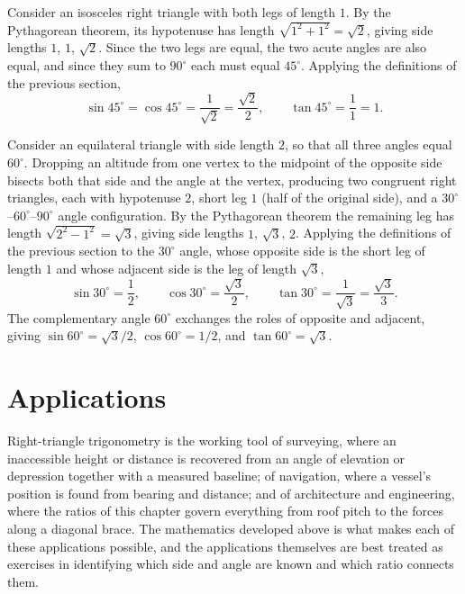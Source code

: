 \begin{example}
Consider an isosceles right triangle with both legs of length $1$. By the
Pythagorean theorem, its hypotenuse has length $\sqrt{1^2+1^2} = \sqrt{2}$,
giving side lengths $1$, $1$, $\sqrt{2}$. Since the two legs are equal, the
two acute angles are also equal, and since they sum to $90^\circ$ each must
equal $45^\circ$. Applying the definitions of the previous section,
\[
\sin 45^\circ = \cos 45^\circ = \frac{1}{\sqrt{2}} = \frac{\sqrt2}{2}, \qquad
\tan 45^\circ = \frac{1}{1} = 1.
\]
\end{example}

\begin{example}
Consider an equilateral triangle with side length $2$, so that all three
angles equal $60^\circ$. Dropping an altitude from one vertex to the
midpoint of the opposite side bisects both that side and the angle at the
vertex, producing two congruent right triangles, each with hypotenuse $2$,
short leg $1$ (half of the original side), and a $30^\circ$--$60^\circ$--$90^\circ$
angle configuration. By the Pythagorean theorem the remaining leg has length
$\sqrt{2^2 - 1^2} = \sqrt{3}$, giving side lengths $1$, $\sqrt3$, $2$.
Applying the definitions of the previous section to the $30^\circ$ angle,
whose opposite side is the short leg of length $1$ and whose adjacent side
is the leg of length $\sqrt3$,
\[
\sin 30^\circ = \frac{1}{2}, \qquad
\cos 30^\circ = \frac{\sqrt3}{2}, \qquad
\tan 30^\circ = \frac{1}{\sqrt3} = \frac{\sqrt3}{3}.
\]
The complementary angle $60^\circ$ exchanges the roles of opposite and
adjacent, giving $\sin 60^\circ = \sqrt3/2$, $\cos 60^\circ = 1/2$, and
$\tan 60^\circ = \sqrt3$.
\end{example}

\section{Applications}

Right-triangle trigonometry is the working tool of surveying, where an
inaccessible height or distance is recovered from an angle of elevation or
depression together with a measured baseline; of navigation, where a
vessel's position is found from bearing and distance; and of architecture
and engineering, where the ratios of this chapter govern everything from
roof pitch to the forces along a diagonal brace. The mathematics developed
above is what makes each of these applications possible, and the
applications themselves are best treated as exercises in identifying which
side and angle are known and which ratio connects them.

